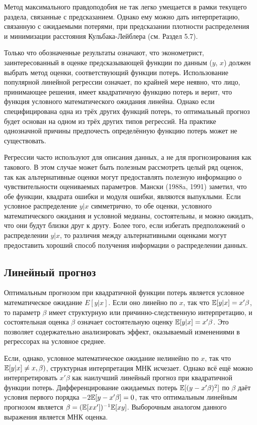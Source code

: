 Метод максимального правдоподобия не так легко умещается в рамки текущего раздела, связанные с предсказанием. Однако ему можно дать интерпретацию, связанную с ожидаемыми потерями, при предсказании плотности распределения и минимизации расстояния Кульбака-Лейблера (см. Раздел 5.7).

Только что обозначенные результаты означают, что эконометрист, заинтересованный в оценке предсказывающей функции по данным ($y$, $x$) должен выбрать метод оценки, соответствующий функции потерь. Использование популярной линейной регрессии означает, по крайней мере неявно, что лицо, принимающее решения, имеет квадратичную функцию потерь и верит, что функция условного математического ожидания линейна. Однако если специфицирована одна из трёх других функций потерь, то оптимальный прогноз будет основан на одном из трёх других типов регрессий. На практике однозначной причины предпочесть определённую функцию потерь может не существовать.

Регрессии часто используют для описания данных, а не для прогнозирования как такового. В этом случае может быть полезным рассмотреть целый ряд оценок, так как альтернативные оценки могут предоставлять полезную информацию о чувствительности оцениваемых параметров. Мански (1988a, 1991) заметил, что обе функции, квадрата ошибки и модуля ошибки, являются выпуклыми. Если условное распределение $y|x$ симметрично, то обе оценки, условного математического ожидания и условной медианы, состоятельны, и можно ожидать, что они будут близки друг к другу. Более того, если избегать предположений о распределении $y|x$, то различия между альтернативными оценками могут предоставить хороший способ получения информации о распределении данных.

\subsection{Линейный прогноз}

Оптимальным прогнозом при квадратичной функции потерь является условное математическое ожидание $E{[y|x]}$. Если оно линейно по $x$, так что $\mathbb{E}{[y|x]} = x' \beta $, то параметр $\beta$ имеет структурную или причинно-следственную интерпретацию, и состоятельная оценка $\beta$ означает состоятельную оценку $\mathbb{E}{[y|x]} = x' \beta $. Это позволяет 	содержательно анализировать эффект, оказываемый изменениями в регрессорах на условное среднее.

Если, однако, условное математическое ожидание нелинейно по $x$, так что $\mathbb{E}{[y|x]} \neq x, \beta)$, структурная интерпретация МНК исчезает. Однако всё ещё можно интерпретировать $x' \beta $ как наилучший линейный прогноз при квадратичной функции потерь. Дифференцирование ожидаемых потерь $\mathbb{E}{[(y - x' \beta)^2]}$ по $\beta$ даёт условия первого порядка $-2 \mathbb{E}{[y - x' \beta]} =0 $, так что оптимальным линейным прогнозом является $\beta = (\mathbb{E}[xx'])^{-1}\mathbb{E}[xy]$. Выборочным аналогом данного выражения является  МНК оценка.

